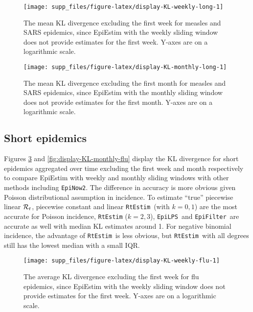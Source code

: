 \documentclass[
]{article}
\begin{document}
\begin{figure}[!ht]

{\centering \texttt{[image: supp\_files/figure-latex/display-KL-weekly-long-1]} 

}

\caption{The mean KL divergence excluding the first week for measles and SARS epidemics, since EpiEstim with the weekly sliding window does not provide estimates for the first week. Y-axes are on a logarithmic scale.}\label{fig:display-KL-weekly-long}
\end{figure}

\begin{figure}[!ht]

{\centering \texttt{[image: supp\_files/figure-latex/display-KL-monthly-long-1]} 

}

\caption{The mean KL divergence excluding the first month for measles and SARS epidemics, since EpiEstim with the monthly sliding window does not provide estimates for the first month. Y-axes are on a logarithmic scale.}\label{fig:display-KL-monthly-long}
\end{figure}

\clearpage

\subsection{Short epidemics}\label{short-epidemics}

Figures \ref{fig:display-KL-weekly-flu} and \ref{fig:display-KL-monthly-flu}
display the KL divergence for short epidemics aggregated over time
excluding the first week and month respectively to compare EpiEstim with weekly
and monthly sliding windows with other methods including \texttt{EpiNow2}.
The difference in accuracy is more obvious given Poisson distributional assumption
in incidence. To estimate ``true'' piecewise linear \(\mathcal{R}_t\), piecewise constant and linear
\texttt{RtEstim}~(with \(k=0,1\)) are the most accurate for Poisson incidence, \texttt{RtEstim} 
(\(k=2,3\)), \texttt{EpiLPS}~and \texttt{EpiFilter}~are accurate as well with median KL estimates around 1.
For negative binomial incidence, the advantage of \texttt{RtEstim}~is less obvious,
but \texttt{RtEstim}~with all degrees still has the lowest median with a small IQR.

\begin{figure}[!ht]

{\centering \texttt{[image: supp\_files/figure-latex/display-KL-weekly-flu-1]} 

}

\caption{The average KL divergence excluding the first week for flu epidemics, since EpiEstim with the weekly sliding window does not provide estimates for the first week. Y-axes are on a logarithmic scale.}\label{fig:display-KL-weekly-flu}
\end{figure}
\end{document}
